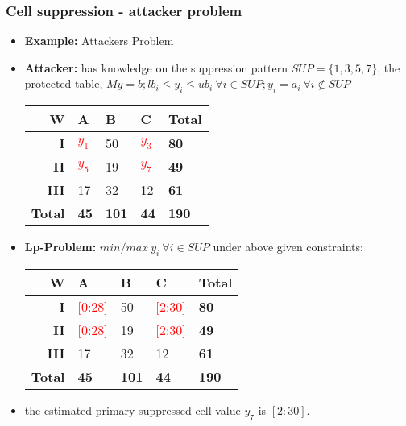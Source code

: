 \begin{frame}\frametitle{Cell suppression - attacker problem}
	\begin{itemize}
		\item {\bf Example:} Attackers Problem \pause
		\item {\bf Attacker:} has knowledge on the suppression pattern $SUP = \{1,3,5,7\}$, the protected table,
		$M y = b; lb_i \leq y_i \leq ub_i ~ \forall i \in SUP; y_i=a_i ~ \forall i \notin SUP$
			\begin{scriptsize}
		\begin{center}
			\begin{tabular}{|r|lll|l|}
			\hline
			{\bf W} & {\bf A} & {\bf B} & {\bf C} & {\bf Total} \\
			\hline
			{\bf I} 	& \textcolor{red}{$y_1$} & 50 & \textcolor{red}{$y_3$} & {\bf 80} \\
			{\bf II} 	& \textcolor{red}{$y_5$} & 19 & \textcolor{red}{$y_7$} & {\bf 49} \\
			{\bf III} & 17 & 32 & 12 & {\bf 61} \\
			\hline
			{\bf Total} & {\bf 45} & {\bf 101} & {\bf 44} & {\bf 190} \\
			\hline
			\end{tabular}
		\end{center}			\end{scriptsize}	\pause
		\item {\bf Lp-Problem:} $min/max ~ y_i ~ \forall i \in SUP$ under above given constraints:\pause
			\begin{scriptsize}
			\begin{center}
				\begin{tabular}{|r|lll|l|}
				\hline
				{\bf W} & {\bf A} & {\bf B} & {\bf C} & {\bf Total} \\
				\hline
				{\bf I} 	& \textcolor{red}{[0:28]} & 50 & \textcolor{red}{[2:30]} & {\bf 80} \\
				{\bf II} 	& \textcolor{red}{[0:28]} & 19 & \textcolor{red}{[2:30]} & {\bf 49} \\
				{\bf III} & 17 & 32 & 12 & {\bf 61} \\
				\hline
				{\bf Total} & {\bf 45} & {\bf 101} & {\bf 44} & {\bf 190} \\
				\hline
				\end{tabular}
			\end{center}				\end{scriptsize}	\pause
		\item the estimated primary suppressed cell value $y_7$ is  $[2:30]$.
	\end{itemize}
\end{frame}

